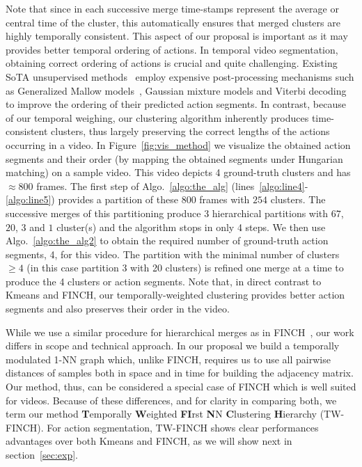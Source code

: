 \documentclass[10pt,twocolumn,letterpaper]{article}
\begin{document}
Note that since in each successive merge time-stamps represent the average or central time of the cluster, this automatically ensures that merged clusters are highly temporally consistent. This aspect of our proposal is important as it may provides better temporal ordering of actions. In temporal video segmentation, obtaining correct ordering of actions is crucial and quite challenging. Existing SoTA unsupervised methods~\cite{ute_paper, mallow, nnv} employ expensive post-processing mechanisms such as Generalized Mallow models~\cite{mallows1957non}, Gaussian mixture models and Viterbi decoding to improve the ordering of their predicted action segments. In contrast, because of our temporal weighing, our clustering algorithm inherently produces time-consistent clusters, thus largely preserving the correct lengths of the actions occurring in a video. In Figure~\ref{fig:vis_method} we visualize the obtained action segments and their order (by mapping the obtained segments under  Hungarian matching) on a sample video. This video depicts 4 ground-truth clusters and has $\approx800$ frames. The first step of Algo.~\ref{algo:the_alg} (lines~\ref{algo:line4}-\ref{algo:line5}) provides a partition of these $800$ frames with $254$ clusters. The successive merges of this partitioning produce 3 hierarchical partitions with $67$, $20$, $3$ and $1$ cluster(s) and the algorithm stops in only 4 steps. 
We then use Algo.~\ref{algo:the_alg2} to obtain the required number of ground-truth action segments, 4, for this video. 
The partition with the minimal number of clusters $\geq 4$ (in this case partition 3 with 20 clusters) is refined one merge at a time to produce the 4 clusters or action segments. Note that, in direct contrast to Kmeans and FINCH, our temporally-weighted clustering provides better action segments and also preserves their order in the video. 

While we use a similar procedure for hierarchical merges as in FINCH~\cite{finch}, our work differs in scope and technical approach.
In our proposal we build a temporally modulated 1-NN graph which, unlike FINCH, requires us to use all pairwise distances of samples both in space and in time for building the adjacency matrix. Our method, thus, can be considered a special case of FINCH which is well suited for videos. Because of these differences, and for clarity in comparing both, we term our method \textbf{T}emporally \textbf{W}eighted \textbf{FI}rst \textbf{N}N \textbf{C}lustering \textbf{H}ierarchy (TW-FINCH). For action segmentation, TW-FINCH shows clear performances advantages over both Kmeans and FINCH, as we will show next in section~\ref{sec:exp}.
\end{document}
